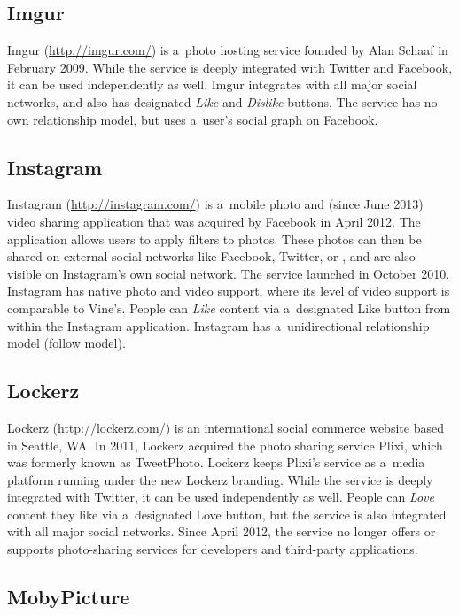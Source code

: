 \subsection{Imgur}

Imgur (\url{http://imgur.com/})
is a~photo hosting service
founded by Alan Schaaf in February 2009.
While the service is deeply integrated with Twitter
and Facebook, it can be used independently as well.
Imgur integrates with all major social networks,
and also has designated \emph{Like} and \emph{Dislike} buttons.
The service has no own relationship model,
but uses a~user's social graph on Facebook.

\subsection{Instagram}
\label{sec:instagram}

Instagram (\url{http://instagram.com/})
is a~mobile photo and (since June 2013) video sharing application
that was acquired by Facebook in April 2012.
The application allows users to apply filters to photos.
These photos can then be shared on external social networks
like Facebook, Twitter, or \googleplus,
and are also visible on Instagram's own social network.
The service launched in October 2010.
Instagram has native photo and video support,
where its level of video support is comparable to Vine's.
People can \emph{Like} content via a~designated Like button
from within the Instagram application.
Instagram has a~unidirectional relationship model (follow model).

\subsection{Lockerz}

Lockerz (\url{http://lockerz.com/}) is an international
social commerce website based in Seattle, WA. 
In 2011, Lockerz acquired the photo sharing service Plixi,
which was formerly known as TweetPhoto.
Lockerz keeps Plixi's service as a~media platform running
under the new Lockerz branding.
While the service is deeply integrated with Twitter,
it can be used independently as well.
People can \emph{Love} content they like via
a~designated Love button,
but the service is also integrated with all major social networks.
Since April 2012, the service no longer offers or supports
photo-sharing services for developers and third-party applications.

\subsection{MobyPicture}


